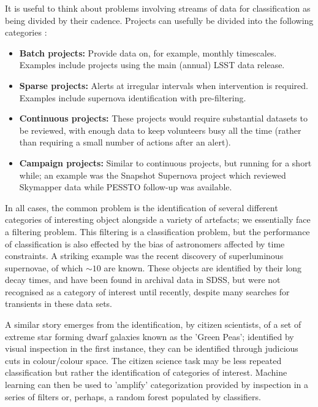 \documentclass{pasa}
\begin{document}
It is useful to think about problems involving streams of data for classification as being divided by their cadence. Projects can usefully be divided into the following categories :

\begin{itemize}

\item \textbf{Batch projects:} Provide data on, for example, monthly timescales. Examples include projects using the main (annual) LSST data release.

\item \textbf{Sparse projects:} Alerts at irregular intervals when intervention is required. Examples include supernova identification with pre-filtering. 

\item \textbf{Continuous projects:} These projects would require substantial datasets to be reviewed, with enough data to keep volunteers busy all the time (rather than requiring a small number of actions after an alert). 

\item \textbf{Campaign projects:} Similar to continuous projects, but running for a short while; an example was the Snapshot Supernova project which reviewed Skymapper data while PESSTO follow-up was available. 

\end{itemize}

In all cases, the common problem is the identification of several different categories of interesting object alongside a variety of artefacts; we essentially face a filtering problem. This filtering is a classification problem, but the performance of classification is also effected by the bias of astronomers affected by time constraints. A striking example was the recent discovery of superluminous supernovae, of which $\sim 10$ are known. These objects are identified by their long decay times, and have been found in archival data in SDSS, but were not recognised as a category of interest until recently, despite many searches for transients in these data sets. 

A similar story emerges from the identification, by citizen scientists, of a set of extreme star forming dwarf galaxies known as the 'Green Peas'; identified by visual inspection in the first instance, they can be identified through judicious cuts in colour/colour space. The citizen science task may be less repeated classification but rather the identification of categories of interest. Machine learning can then be used to 'amplify' categorization provided by inspection in a series of filters or, perhaps, a random forest populated by classifiers. 
\end{document}
